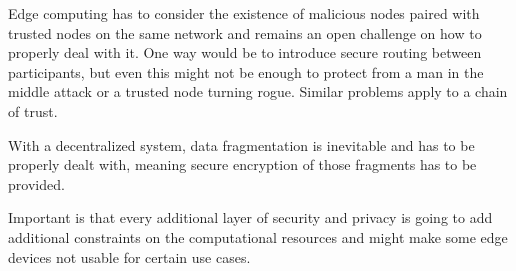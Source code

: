 Edge computing has to consider the existence of malicious nodes paired with trusted nodes on the same network and remains an open challenge on how to properly deal with it.
One way would be to introduce secure routing between participants, but even this might not be enough to protect from a man in the middle attack or a trusted node turning rogue. Similar problems apply to a chain of trust.

With a decentralized system, data fragmentation is inevitable and has to be properly dealt with, meaning secure encryption of those fragments has to be provided.

Important is that every additional layer of security and privacy is going to add additional constraints on the computational resources and might make some edge devices not usable for certain use cases.